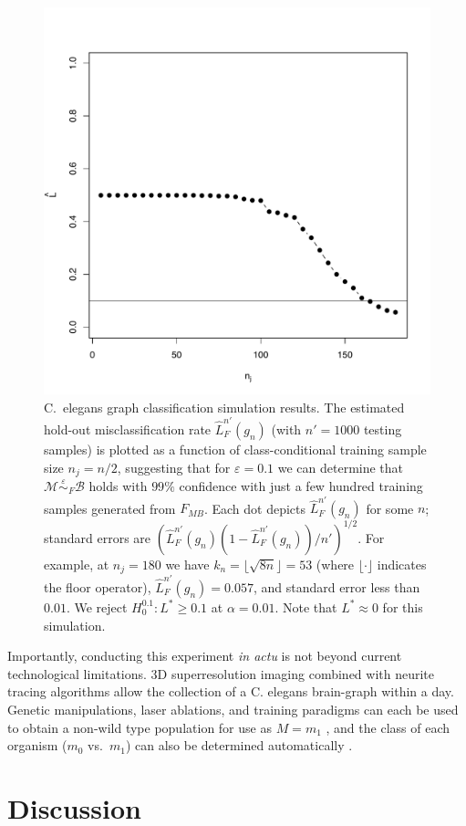 \documentclass{article}
\newcommand{\mB}{\mathcal{B}}
\newcommand{\mM}{\mathcal{M}}
\newcommand{\PP}{\mathbb{P}}           %
\providecommand{\mt}[1]{\widetilde{#1}}
\newcommand{\hL}{\widehat{L}}
\newcommand{\MeB}{\mM \overset{\varepsilon}{{\sim}}_{F} \mB}
\begin{document}
\begin{figure}[!ht]
\centering 
\includegraphics[width=.5\linewidth]{Lhatplot}
\caption{C.~elegans graph classification simulation results.  The estimated hold-out misclassification rate $\hL^{n'}_{F}(g_{n})$  (with $n'=1000$ testing samples) %
is plotted as a function of class-conditional training sample size $n_j=n/2$, suggesting that for $\varepsilon=0.1$ we can determine that $\MeB$ holds with $99\%$ confidence with just a few hundred training samples generated from $F_{MB}$. Each dot depicts $\hL^{n'}_{F}(g_n)$ for some $n$; standard errors are $(\hL^{n'}_{F}(g_{n}) (1-\hL^{n'}_{F}(g_{n}))/n')^{1/2}$.  For example, at $n_j = 180$ we have $k_n = \lfloor\sqrt{8 n}\rfloor=53$ (where $\lfloor\cdot\rfloor$ indicates the floor operator), $\hL^{n'}_{F}(g_{n}) = 0.057$, and standard error less than $0.01$. We reject $H_0^{0.1}: L^* \geq 0.1$ at $\alpha=0.01$. Note that $L^* \approx 0$ for this simulation.}
\label{fig:1}
\end{figure}

Importantly, conducting this experiment {\it in actu} is not beyond current technological limitations. 3D superresolution imaging \cite{Vaziri2008} combined with neurite tracing algorithms \cite{Helmstaedter2008,Mishchenko09,LuLichtman09} allow the collection of a C. elegans brain-graph within a day. Genetic manipulations, laser ablations, and training paradigms can each be used to obtain a non-wild type population for use as $M=m_1$ \cite{deBonoMaricq05}, and the class of each organism ($m_0$ vs.~$m_1$) can also be determined automatically \cite{Buckingham2008}.





\section*{Discussion}
\end{document}
